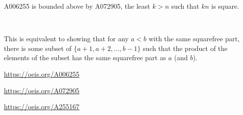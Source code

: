\documentclass{article}
\begin{document}
\begin{note}
  A006255 is bounded above by A072905, the least $k > n$ such that $kn$
  is square.

  ~

  \noindent
  This is equivalent to showing that for any $a < b$ with the same
  squarefree part, there is some subset of $\{ a + 1, a + 2, \hdots, b - 1 \}$
  such that the product of the elements of the subset has the same squarefree
  part as $a$ (and $b$).
\end{note}

\begin{references}
  \item \url{https://oeis.org/A006255}
  \item \url{https://oeis.org/A072905}
  \item \url{https://oeis.org/A255167}
\end{references}
\end{document}
